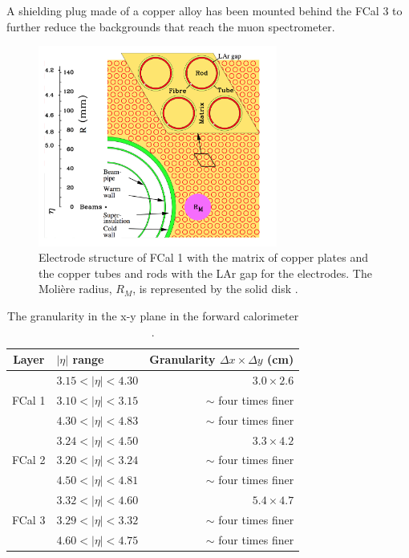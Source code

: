 A shielding plug made of a copper alloy has been mounted behind the FCal 3 to further reduce the backgrounds that reach the muon spectrometer.

\begin{figure}
\centering
\includegraphics[width=0.7\textwidth]{data/photo/detector/forward.png}
\caption{Electrode structure of FCal 1 with the matrix of copper plates and the copper tubes and rods with the LAr gap for the electrodes. The Moli\`ere radius, $R_M$, is represented by the solid disk \cite{ATLAS_doc}.}
\label{fig:forward_calorimeter}
\end{figure}

\begin{table}[htpb]
\centering
\begin{tabular}{|c|l|r|}
\hline
Layer & $|\eta|$ range & Granularity $\Delta x \times \Delta y$ (cm) \\
\hline
\hline
       & $3.15 < |\eta| < 4.30$   & $3.0 \times 2.6$ \\
FCal 1 & $3.10 < |\eta| < 3.15$   & $\sim$ four times finer \\
       & $4.30 < |\eta| < 4.83$   & $\sim$ four times finer \\
\hline
       & $3.24 < |\eta| < 4.50$   & $3.3 \times 4.2$ \\
FCal 2 & $3.20 < |\eta| < 3.24$   & $\sim$ four times finer \\
       & $4.50 < |\eta| < 4.81$   & $\sim$ four times finer \\
\hline
       & $3.32 < |\eta| < 4.60$   & $5.4 \times 4.7$ \\
FCal 3 & $3.29 < |\eta| < 3.32$   & $\sim$ four times finer \\
       & $4.60 < |\eta| < 4.75$   & $\sim$ four times finer \\
\hline
\end{tabular}
\caption{The granularity in the x-y plane in the forward calorimeter \cite{ATLAS_doc}.}
\label{tab:granularity_FCal}
\end{table}


